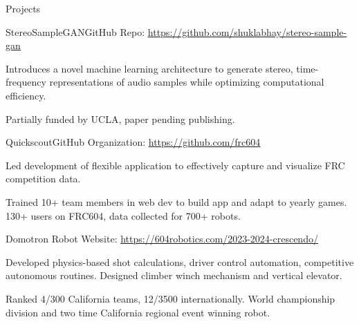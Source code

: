 \documentclass[
  10pt, %
]{public/resume/resume} %
\begin{document}

\begin{rSection}{Projects}

  
  \begin{rSubsection}{StereoSampleGAN}{}{GitHub Repo: \underline{\href{https://github.com/shuklabhay/stereo-sample-gan}{https://github.com/shuklabhay/stereo-sample-gan}}}{}
       
    \item Introduces a novel machine learning architecture to generate stereo, time-frequency representations of audio samples while optimizing computational efficiency.
        
    \item Partially funded by UCLA, paper pending publishing.
        
  \end{rSubsection}
      
  \begin{rSubsection}{Quickscout}{}{GitHub Organization: \underline{\href{https://github.com/frc604}{https://github.com/frc604}}}{}
       
    \item Led development of flexible application to effectively capture and visualize FRC competition data.
        
    \item Trained 10+ team members in web dev to build app and adapt to yearly games. 130+ users on FRC604, data collected for 700+ robots.
        
  \end{rSubsection}
      
  \begin{rSubsection}{Domotron }{}{Robot Website: \underline{\href{https://604robotics.com/2023-2024-crescendo/}{https://604robotics.com/2023-2024-crescendo/}}}{}
       
    \item Developed physics-based shot calculations, driver control automation, competitive autonomous routines. Designed climber winch mechanism and vertical elevator.
        
    \item Ranked 4/300 California teams, 12/3500 internationally. World championship division and two time California regional event winning robot.
        

\end{rSubsection}
\end{rSection}
\end{document}
